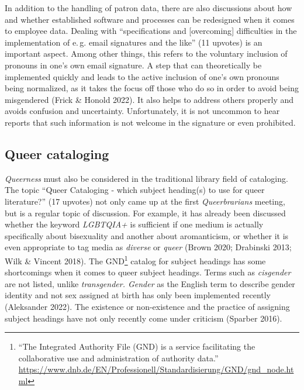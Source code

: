\documentclass[a4paper,
fontsize=11pt,
oneside,
numbers=noperiodatend,
parskip=half-,
bibliography=totoc,
final
]{scrartcl}
\begin{document}
In addition to the handling of patron data, there are also discussions
about how and whether established software and processes can be
redesigned when it comes to employee data. Dealing with \enquote{specifications
and {[}overcoming{]} difficulties in the implementation of e.\,g. email
signatures and the like} (11 upvotes) is an important aspect. Among
other things, this refers to the voluntary inclusion of pronouns in
one's own email signature. A step that can theoretically
be implemented quickly and leads to the active inclusion of
one's own pronouns being normalized, as it takes the
focus off those who do so in order to avoid being misgendered (Frick \&
Honold 2022). It also helps to address others properly and avoids
confusion and uncertainty. Unfortunately, it is not uncommon to hear
reports that such information is not welcome in the signature or even
prohibited.

\hypertarget{queer-cataloging}{%
\subsection{Queer cataloging}\label{queer-cataloging}}

\emph{Queerness} must also be considered in the traditional library
field of cataloging. The topic \enquote{Queer Cataloging - which subject
heading(s) to use for queer literature?} (17 upvotes) not only came up
at the first \emph{Queerbrarians} meeting, but is a regular topic of
discussion. For example, it has already been discussed whether the
keyword \emph{LGBTQIA+} is sufficient if one medium is actually
specifically about bisexuality and another about aromanticism, or
whether it is even appropriate to tag media as \emph{diverse} or
\emph{queer} (Brown 2020; Drabinski 2013; Wilk \& Vincent 2018). The
GND\footnote{\enquote{The Integrated Authority File (GND) is a service
  facilitating the collaborative use and administration of authority
  data.}
  \url{https://www.dnb.de/EN/Professionell/Standardisierung/GND/gnd_node.html}}
catalog for subject headings has some shortcomings when it comes to
queer subject headings. Terms such as \emph{cisgender} are not listed,
unlike \emph{transgender. Gender} as the English term to describe gender
identity and not sex assigned at birth has only been implemented
recently (Aleksander 2022). The existence or non-existence and the
practice of assigning subject headings have not only recently come under
criticism (Sparber 2016).
\end{document}
